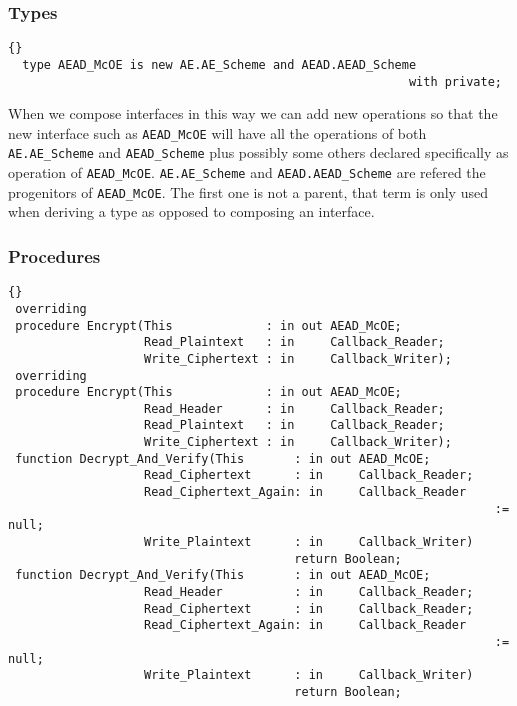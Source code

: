 \subsubsection*{Types}
\begin{lstlisting}{}
  type AEAD_McOE is new AE.AE_Scheme and AEAD.AEAD_Scheme 
  														with private;
\end{lstlisting}
When we compose interfaces in this way we can add new operations so that the new interface such as \texttt{AEAD\_McOE} will have all the operations of both \texttt{AE.AE\_Scheme} and \texttt{AEAD\_Scheme} plus possibly some others declared specifically as operation of \texttt{AEAD\_McOE}. \texttt{AE.AE\_Scheme} and \texttt{AEAD.AEAD\_Scheme} are refered the progenitors of \texttt{AEAD\_McOE}. The first one is not a parent, that term is only used when deriving a type as opposed to composing an interface.\\
\subsubsection*{Procedures}
\begin{lstlisting}{}
 overriding
 procedure Encrypt(This             : in out AEAD_McOE;
                   Read_Plaintext   : in     Callback_Reader;
                   Write_Ciphertext : in     Callback_Writer);
 overriding
 procedure Encrypt(This             : in out AEAD_McOE;
                   Read_Header      : in     Callback_Reader;
                   Read_Plaintext   : in     Callback_Reader;
                   Write_Ciphertext : in     Callback_Writer);
 function Decrypt_And_Verify(This       : in out AEAD_McOE;
                   Read_Ciphertext      : in     Callback_Reader;
                   Read_Ciphertext_Again: in     Callback_Reader
                   													:= null;
                   Write_Plaintext      : in     Callback_Writer)
                               			return Boolean;
 function Decrypt_And_Verify(This       : in out AEAD_McOE;
                   Read_Header          : in     Callback_Reader;
                   Read_Ciphertext      : in     Callback_Reader;
                   Read_Ciphertext_Again: in     Callback_Reader 
                   													:= null;
                   Write_Plaintext      : in     Callback_Writer)
                               			return Boolean;
\end{lstlisting}


